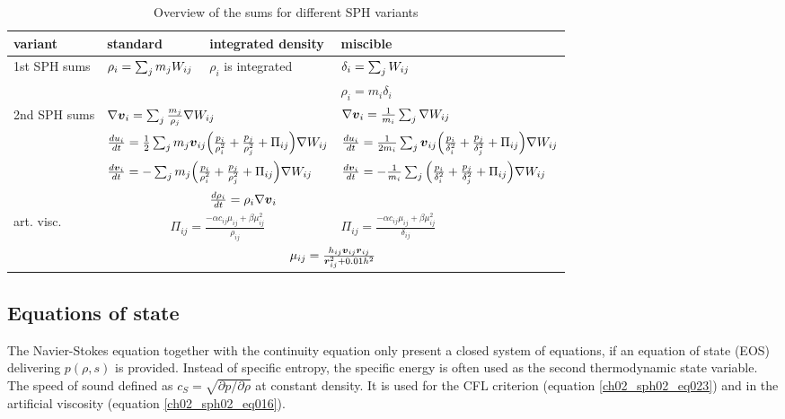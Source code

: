 \begin{table}[htdp]
\begin{center}
\begin{tabular}{|l|l|l|l|}
\hline
variant & standard & integrated density & miscible \\
\hline \hline
\multirow{2}{1.5cm}{1st SPH sums} & 
\multirow{2}{2.5cm}{$\rho_i = \sum_{j} m_j W_{ij} $} & 
\multirow{2}{2.0cm}{$\rho_i$ is integrated}  & 
$ \delta_i = \sum_{j} W_{ij}$ \\
 &
 &
 & 
$\rho_i = m_i \delta_i $ \\
\hline
\multirow{4}{1.5cm}{2nd SPH sums} &
\multicolumn{2}{|l|}{$ \nabla \boldsymbol{v}_i = \sum_{j} \frac{m_j}{\rho_j} \nabla W_{ij} $} & 
$ \nabla \boldsymbol{v}_i = \frac{1}{m_i} \sum_{j} \nabla W_{ij} $ \\
& 
\multicolumn{2}{|l|}{$ \frac{du_i}{dt} = \frac{1}{2} \sum_{j} m_{j} \boldsymbol{v}_{ij} \Big( \frac{p_i}{\rho_i^2}  + \frac{p_j}{\rho_j^2} + \Pi_{ij} \Big) \nabla W_{ij} $} & 
$ \frac{du_i}{dt} = \frac{1}{2 m_i} \sum_{j} \boldsymbol{v}_{ij} \Big( \frac{p_i}{\delta_i^2}  + \frac{p_j}{\delta_j^2} + \Pi_{ij} \Big)  \nabla W_{ij} $ \\
& 
\multicolumn{2}{|l|}{$\frac{d \boldsymbol{v}_i }{dt} = - \sum_{j} m_j \Big( \frac{p_i}{\rho_i^2} + \frac{p_j}{\rho_j^2}  +\Pi_{ij} \Big) \nabla W_{ij}$} & 
$\frac{d \boldsymbol{v}_i }{dt} = - \frac{1}{m_i} \sum_{j} \Big( \frac{p_i}{\delta_i^2} + \frac{p_j}{\delta_j^2} + \Pi_{ij} \Big) \nabla W_{ij}$\\
&   
& 
$\frac{d \rho_i}{dt} = \rho_i \nabla \boldsymbol{v}_i$ & \\
\hline
art. visc. & \multicolumn{2}{|c|}{$\Pi_{ij} = \frac{- \alpha c_{ij} \mu_{ij} +  \beta \mu_{ij}^2 }{\rho_{ij} } $} & $\Pi_{ij} = \frac{- \alpha c_{ij} \mu_{ij} +  \beta \mu_{ij}^2 }{\delta_{ij} } $ \\
 & \multicolumn{3}{|c|}{$\mu_{ij} = \frac{h_{ij} \boldsymbol{v}_{ij} \boldsymbol{r}_{ij}}{\boldsymbol{r}_{ij}^2+ 0.01h^2} $} \\
\hline
\end{tabular}
\caption{Overview of the sums for different SPH variants}
\label{ch02_sph01_tabl01}
\end{center}
\end{table}


\subsection{Equations of state}
The Navier-Stokes equation together with the continuity equation only present a closed system of equations, if an equation of state (EOS) delivering $p(\rho, s)$ is provided. Instead of specific entropy, the specific energy is often used as the second thermodynamic state variable. The speed of sound defined as $c_S = \sqrt{ \partial p / \partial \rho }$ at constant density. It is used for the CFL criterion (equation \ref{ch02_sph02_eq023}) and in the artificial viscosity (equation \ref{ch02_sph02_eq016}).

